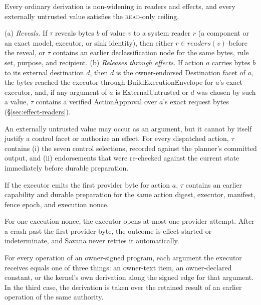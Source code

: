 \documentclass[letterpaper,twocolumn,10pt]{article}
\newcommand{\sys}{Savana}
\newcommand{\READ}{\textsc{read}}
\newcommand{\readers}{\mathit{readers}}
\begin{document}
\begin{description}[style=nextline,font=\bfseries]
\item[P1 Label closure.] Every ordinary derivation is non-widening in
  readers and effects, and every externally untrusted value satisfies the
  \READ-only ceiling.
\item[P2 Mediated disclosure.] (a) \emph{Reveals.} If $\tau$ reveals bytes
  $b$ of value $v$ to a system reader $r$ (a component or an exact model,
  executor, or sink identity), then either $r\in\readers(v)$ before the
  reveal, or $\tau$ contains an earlier declassification node for the same
  bytes, rule set, purpose, and recipient. (b) \emph{Releases through
  effects.} If action $a$ carries bytes $b$ to its external destination
  $d$, then $d$ is the owner-endorsed \textsf{Destination} facet of $a$,
  the bytes reached the executor through \textsf{BuildExecutionEnvelope}
  for $a$'s exact executor, and, if any argument of $a$ is
  \textsf{ExternalUntrusted} or $d$ was chosen by such a value, $\tau$
  contains a verified \textsf{ActionApproval} over $a$'s exact request
  bytes (\S\ref{sec:effect-readers}).
\item[P3 No data- or selection-derived authority.] An externally untrusted
  value may occur as an argument, but it cannot by itself justify a control
  facet or authorize an effect. For every dispatched action, $\tau$
  contains (i) the seven control selections, recorded against the
  planner's committed output, and (ii) endorsements that were re-checked
  against the current state immediately before durable preparation.
\item[P4 Authorized emission.] If the executor emits the first provider
  byte for action $a$, $\tau$ contains an earlier capability and durable
  preparation for the same action digest, executor, manifest, fence epoch,
  and execution nonce.
\item[P5 Crash containment.] For one execution nonce, the executor opens
  at most one provider attempt. After a crash past the first provider byte,
  the outcome is effect-started or indeterminate, and \sys{} never retries
  it automatically.
\item[P6 Origin confinement.] For every operation of an owner-signed
  program, each argument the executor receives equals one of three things:
  an owner-text item, an owner-declared constant, or the kernel's own
  derivation along the signed edge for that argument. In the third case,
  the derivation is taken over the retained result of an earlier operation
  of the same authority.
\end{description}
\end{document}
